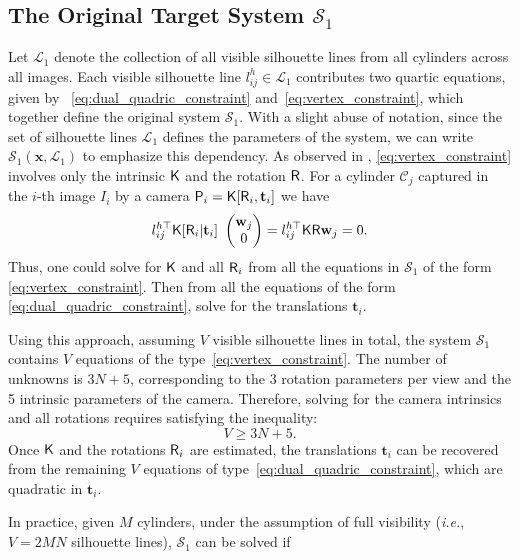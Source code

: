 \subsection{The Original Target System $\mathcal{S}_1$}
Let $\mathcal{L}_1$ denote the collection of all visible silhouette lines from all cylinders across all images. Each visible silhouette line $l_{ij}^h \in \mathcal{L}_1$ contributes two quartic equations, given by ~\eqref{eq:dual_quadric_constraint} and~\eqref{eq:vertex_constraint}, which together define the original system $\mathcal{S}_1$. With a slight abuse of notation, since the set of silhouette lines $\mathcal{L}_1$ defines the parameters of the system, we can write $\mathcal{S}_1(\mathbf{x},\mathcal{L}_1)$ to emphasize this dependency.
As observed in \cite{gummeson24relative},  \eqref{eq:vertex_constraint} involves only the intrinsic $\mathsf{K}$ and the rotation $\mathsf{R}$. For a cylinder $\mathcal{C}_j$ captured in the $i$-th image $I_i$ by a camera $\mathsf{P}_i=\mathsf{K}[\mathsf{R}_i,\mathbf{t}_i]$ we have
 \begin{equation}
             l^{h\top}_{ij} \KK [\RR_i|\mathbf{t}_i] \ \begin{pmatrix}
                \mathbf{w}_j \\
                0
            \end{pmatrix} = l^{h\top}_{ij} \KK\RR \mathbf{w}_j
             = 0.
    \label{eq:expanded_vertex_constraint}
    \end{equation}
Thus, one could solve for $\mathsf{K}$ and all $\mathsf{R}_i$ from all the equations in $\mathcal{S}_1$ of the form \eqref{eq:vertex_constraint}. Then from all the equations of the form \eqref{eq:dual_quadric_constraint}, solve for the translations $\mathbf{t}_i$.

Using this approach, assuming $V$ visible silhouette lines in total, the system $\mathcal{S}_1$ contains $V$ equations of the type~\eqref{eq:vertex_constraint}.  The number of unknowns is $3N + 5$, corresponding to the 3 rotation parameters per view and the 5 intrinsic parameters of the camera. Therefore, solving for the camera intrinsics and all rotations requires satisfying the inequality:
\begin{equation}
V \geq 3N + 5.
\end{equation}
Once $\mathsf{K}$ and the rotations $\mathsf{R}_i$ are estimated, the translations $\mathbf{t}_i$ can be recovered from the remaining $V$ equations of  type~\eqref{eq:dual_quadric_constraint}, which are quadratic in $\mathbf{t}_i$.

In practice, given $M$ cylinders, under the assumption of full visibility (\emph{i.e.}, $V = 2MN$ silhouette lines), $\mathcal{S}_1$ can be solved if

